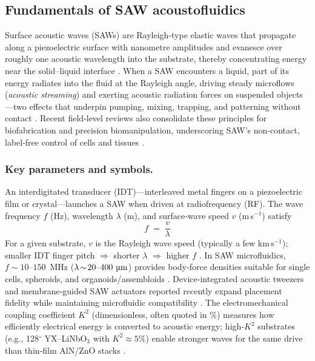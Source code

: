 \documentclass[referee,pdflatex, sn-vancouver-num]{sn-jnl}%
\theoremstyle{thmstyleone}%
\theoremstyle{thmstyletwo}%
\theoremstyle{thmstylethree}%
\begin{document}
\subsection{Fundamentals of SAW acoustofluidics}
Surface acoustic waves (SAWs) are Rayleigh‑type elastic waves that propagate along a piezoelectric surface with nanometre amplitudes and evanesce over roughly one acoustic wavelength into the substrate, thereby concentrating energy near the solid–liquid interface \cite{Friend2011,Yeo2014_SAWmicrofluidics}. When a SAW encounters a liquid, part of its energy radiates into the fluid at the Rayleigh angle, driving steady microflows (\emph{acoustic streaming}) and exerting acoustic radiation forces on suspended objects—two effects that underpin pumping, mixing, trapping, and patterning without contact \cite{Ding2013,Gedge2012_SAW, Friend2011,Yeo2014_SAWmicrofluidics}. Recent field‑level reviews also consolidate these principles for biofabrication and precision biomanipulation, underscoring SAW’s non‑contact, label‑free control of cells and tissues \cite{Wu2024_MicroNano,Rufo2022_NatCommun}.

\subsubsection{Key parameters and symbols.}
An interdigitated transducer (IDT)—interleaved metal fingers on a piezoelectric film or crystal—launches a SAW when driven at radiofrequency (RF). The wave frequency \(f\) (Hz), wavelength \(\lambda\) (m), and surface‑wave speed \(v\) (m\,s\(^{-1}\)) satisfy
\[
f \;=\; \frac{v}{\lambda}
\]
For a given substrate, \(v\) is the Rayleigh wave speed (typically a few km\,s\(^{-1}\)); smaller IDT finger pitch \(\Rightarrow\) shorter \(\lambda\) \(\Rightarrow\) higher \(f\) \cite{Friend2011,Yeo2014_SAWmicrofluidics, Bruus2015_Governing_Equations}. In SAW microfluidics, \(f\!\sim\!10\text{–}150\)~MHz (\(\lambda\!\sim\!20\text{–}400~\text{\textmu m}\)) provides body‑force densities suitable for single cells, spheroids, and organoids/assembloids \cite{Shilton2008_NanoDisp,Gedge2012_SAW}. Device‑integrated acoustic tweezers and membrane‑guided SAW actuators reported recently expand placement fidelity while maintaining microfluidic compatibility \cite{Vachon2023_LabChip,Yang2022_SteAST}. The electromechanical coupling coefficient \(K^2\) (dimensionless, often quoted in \%) measures how efficiently electrical energy is converted to acoustic energy; high‑\(K^2\) substrates (e.g., 128$^{\circ}$ YX–LiNbO\(_3\) with \(K^2\!\approx\!5\%\)) enable stronger waves for the same drive than thin‑film AlN/ZnO stacks \cite{Campbell1998,Yeo2014_SAWmicrofluidics}.
\end{document}
